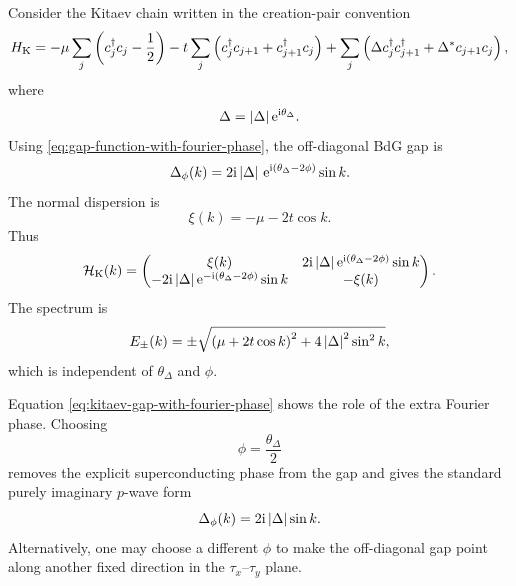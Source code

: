 Consider the Kitaev chain written in the creation-pair convention
\begin{equation}
\label{eq:kitaev-chain-complex-gap-fourier-chapter}
    H_{\rm K}
    =
    -\mu\sum_j\left(c_j^\dagger c_j-\frac{1}{2}\right)
    -t\sum_j\left(c_j^\dagger c_{j+1}+c_{j+1}^\dagger c_j\right)
    +\sum_j\left(
        \Delta c_j^\dagger c_{j+1}^\dagger
        +
        \Delta^* c_{j+1}c_j
    \right),
\end{equation}
where
\begin{equation}
    \Delta=\left|\Delta\right|\mathrm{e}^{\mathrm{i}\theta_\Delta}.
\end{equation}
Using \cref{eq:gap-function-with-fourier-phase}, the off-diagonal BdG gap is
\begin{equation}
\label{eq:kitaev-gap-with-fourier-phase}
    \Delta_\phi(k)
    =
    2\mathrm{i}\left|\Delta\right|\,
    \mathrm{e}^{\mathrm{i}(\theta_\Delta-2\phi)}\sin k.
\end{equation}
The normal dispersion is
\begin{equation}
    \xi(k)=-\mu-2t\cos k.
\end{equation}
Thus
\begin{equation}
\label{eq:kitaev-bdg-complex-gap-fourier-chapter}
    \mathcal{H}_{\rm K}(k)
    =
    \begin{pmatrix}
        \xi(k) & 2\mathrm{i}\left|\Delta\right|\mathrm{e}^{\mathrm{i}(\theta_\Delta-2\phi)}\sin k\\
        -2\mathrm{i}\left|\Delta\right|\mathrm{e}^{-\mathrm{i}(\theta_\Delta-2\phi)}\sin k & -\xi(k)
    \end{pmatrix}.
\end{equation}
The spectrum is
\begin{equation}
    E_\pm(k)
    =
    \pm\sqrt{\left(\mu+2t\cos k\right)^2
    +4\left|\Delta\right|^2\sin^2k},
\end{equation}
which is independent of $\theta_\Delta$ and $\phi$.

Equation \cref{eq:kitaev-gap-with-fourier-phase} shows the role of the extra
Fourier phase.  Choosing
\begin{equation}
    \phi=\frac{\theta_\Delta}{2}
\end{equation}
removes the explicit superconducting phase from the gap and gives the standard
purely imaginary $p$-wave form
\begin{equation}
    \Delta_\phi(k)=2\mathrm{i}\left|\Delta\right|\sin k.
\end{equation}
Alternatively, one may choose a different $\phi$ to make the off-diagonal gap point
along another fixed direction in the $\tau_x$--$\tau_y$ plane.

